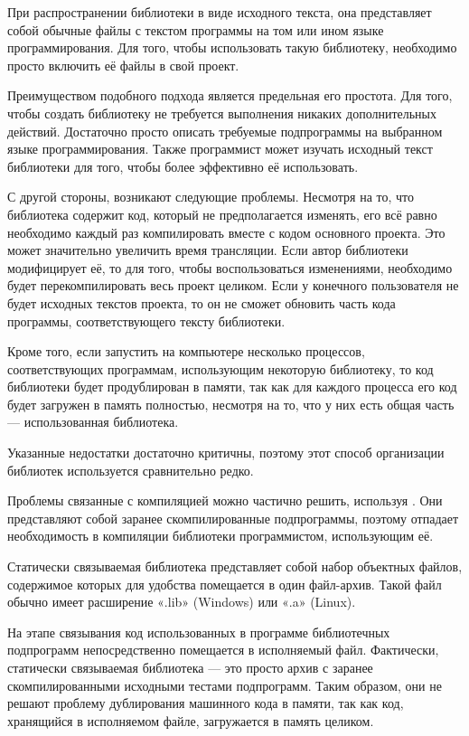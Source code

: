 
При распространении библиотеки в виде исходного текста, она
представляет собой обычные файлы с текстом программы на том или ином
языке программирования. Для того, чтобы использовать такую библиотеку,
необходимо просто включить её файлы в свой проект.

Преимуществом подобного подхода является предельная его простота.  Для
того, чтобы создать библиотеку не требуется выполнения никаких
дополнительных действий. Достаточно просто описать требуемые
подпрограммы на выбранном языке программирования. Также программист
может изучать исходный текст библиотеки для того, чтобы более
эффективно её использовать.

С другой стороны, возникают следующие проблемы. Несмотря на то, что
библиотека содержит код, который не предполагается изменять, его всё
равно необходимо каждый раз компилировать вместе с кодом основного
проекта. Это может значительно увеличить время трансляции. Если автор
библиотеки модифицирует её, то для того, чтобы воспользоваться
изменениями, необходимо будет перекомпилировать весь проект
целиком. Если у конечного пользователя не будет исходных текстов
проекта, то он не сможет обновить часть кода программы,
соответствующего тексту библиотеки.

Кроме того, если запустить на компьютере несколько процессов,
соответствующих программам, использующим некоторую библиотеку, то код
библиотеки будет продублирован в памяти, так как для каждого процесса
его код будет загружен в память полностью, несмотря на то, что у них
есть общая часть — использованная библиотека.

Указанные недостатки достаточно критичны, поэтому этот способ
организации библиотек используется сравнительно редко.


Проблемы связанные с компиляцией можно частично решить, используя
. Они представляют собой заранее скомпилированные
подпрограммы, поэтому отпадает необходимость в компиляции библиотеки
программистом, использующим её.

Статически связываемая библиотека представляет собой набор объектных
файлов, содержимое которых для удобства помещается в один файл-архив.
Такой файл обычно имеет расширение «.lib» (Windows) или «.a» (Linux).

На этапе связывания код использованных в программе библиотечных
подпрограмм непосредственно помещается в исполняемый файл. Фактически,
статически связываемая библиотека — это просто архив с заранее
скомпилированными исходными тестами подпрограмм. Таким образом, они не
решают проблему дублирования машинного кода в памяти, так как код,
хранящийся в исполняемом файле, загружается в память целиком.

